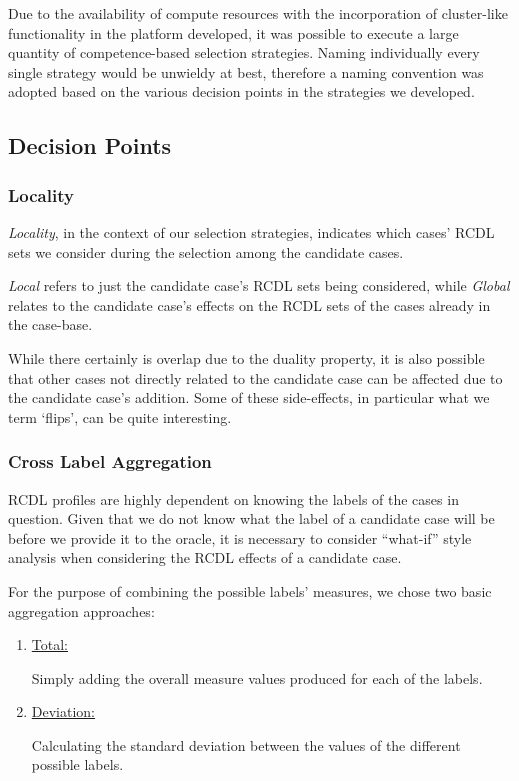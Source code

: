 \documentclass[a4paper,11pt]{report}
\begin{document}
Due to the availability of compute resources with the incorporation of cluster-like functionality in the platform developed, it was possible to execute a large quantity of competence-based selection strategies. Naming individually every single strategy would be unwieldy at best, therefore a naming convention was adopted based on the various decision points in the strategies we developed.

\subsection{Decision Points}

\subsubsection{Locality}
\emph{Locality}, in the context of our selection strategies, indicates which cases' RCDL sets we consider during the selection among the candidate cases.

\emph{Local} refers to just the candidate case's RCDL sets being considered, while \emph{Global} relates to the candidate case's effects on the RCDL sets of the cases already in the case-base. 

While there certainly is overlap due to the duality property, it is also possible that other cases not directly related to the candidate case can be affected due to the candidate case's addition. Some of these side-effects, in particular what we term `flips', can be quite interesting.

\subsubsection{Cross Label Aggregation}
RCDL profiles are highly dependent on knowing the labels of the cases in question. Given that we do not know what the label of a candidate case will be before we provide it to the oracle, it is necessary to consider ``what-if'' style analysis when considering the RCDL effects of a candidate case.

For the purpose of combining the possible labels' measures, we chose two basic aggregation approaches: 
\begin{enumerate}
\item \underline{Total:} 

Simply adding the overall measure values produced for each of the labels.
\item \underline{Deviation:} 

Calculating the standard deviation between the values of the different possible labels.
\end{enumerate}
\end{document}
